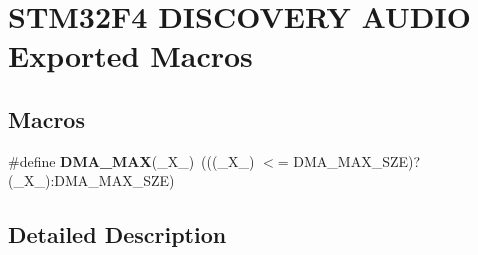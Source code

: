 \hypertarget{group___s_t_m32_f4___d_i_s_c_o_v_e_r_y___a_u_d_i_o___exported___macros}{}\section{S\+T\+M32\+F4 D\+I\+S\+C\+O\+V\+E\+RY A\+U\+D\+IO Exported Macros}
\label{group___s_t_m32_f4___d_i_s_c_o_v_e_r_y___a_u_d_i_o___exported___macros}
\subsection*{Macros}
\begin{DoxyCompactItemize}
\item 
\mbox{\label{group___s_t_m32_f4___d_i_s_c_o_v_e_r_y___a_u_d_i_o___exported___macros_ga45760c0b290a6a66b6c12c536be9d09d}} 
\#define {\bfseries D\+M\+A\+\_\+\+M\+AX}(\+\_\+\+X\+\_\+)~(((\+\_\+\+X\+\_\+) $<$= D\+M\+A\+\_\+\+M\+A\+X\+\_\+\+S\+ZE)? (\+\_\+\+X\+\_\+)\+:D\+M\+A\+\_\+\+M\+A\+X\+\_\+\+S\+ZE)
\end{DoxyCompactItemize}


\subsection{Detailed Description}
